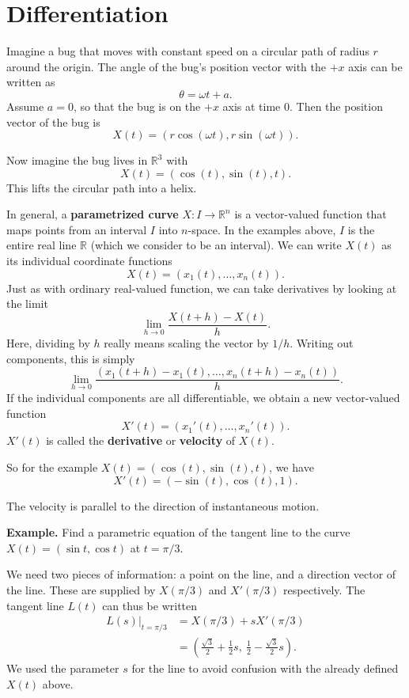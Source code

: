 \documentclass{article}
\begin{document}



\section*{Differentiation}

Imagine a bug that moves with constant speed on a circular path of 
radius $r$ around the origin.
The angle of the bug's position vector with the $+x$ axis can
be written as 
\[\theta = \omega t + a.\]
Assume $a=0$, so that the bug is on the $+x$ axis at time $0$.
Then the position vector of the bug is 
\[X(t) = (r \cos (\omega t), r \sin(\omega t)).\]

Now imagine the bug lives in $\mathbb{R}^3$ with
\[X(t) = (\cos(t), \sin(t), t).\]
This lifts the circular path into a helix.

In general, a \textbf{parametrized curve} $X : I \to \mathbb{R}^n$ is a vector-valued function
that maps points from an interval $I$ into $n$-space. In the examples above,
$I$ is the entire real line $\mathbb{R}$ (which we consider to be an interval). 
We can write $X(t)$ as its individual coordinate functions
\[X(t) = (x_1(t), \ldots, x_n(t)).\]
Just as with ordinary real-valued function, we can take derivatives by 
looking at the limit
\[\lim_{h \to 0} \frac{X(t+h)-X(t)}{h}.\]
Here, dividing by $h$ really means scaling the vector by $1/h$. Writing out components, this is simply
\[\lim_{h \to 0} \frac{(x_1(t+h)-x_1(t), \ldots, x_n(t+h)-x_n(t))}{h}.\]
If the individual components are all differentiable, we obtain a
new vector-valued function
\[X'(t) = (x_1'(t), \ldots, x_n'(t)).\]
$X'(t)$ is called the \textbf{derivative} or \textbf{velocity} of $X(t)$. 

So for the example $X(t) = (\cos(t), \sin(t), t)$, we have
\[X'(t) = (-\sin(t), \cos(t), 1).\]

The velocity is parallel to the direction of instantaneous motion.


\textbf{Example.} 
Find a parametric equation of the tangent line to the curve $X(t) = (\sin t, \cos t)$
at $t=\pi/3$. 

We need two pieces of information: a point on the line, and a direction vector of the line.
These are supplied by $X(\pi/3)$ and $X'(\pi/3)$ respectively. The tangent line $L(t)$ can thus be 
written 
\begin{align*}
    L(s) |_{t=\pi/3} &= X(\pi/3) + sX'(\pi/3)  \\
    &= \left( \frac{\sqrt{3}}{2} + \frac{1}{2}s,\ \frac{1}{2} - \frac{\sqrt{3}}{2}s \right).
\end{align*}
We used the parameter $s$ for the line to avoid confusion with the already defined $X(t)$ above.
\end{document}
